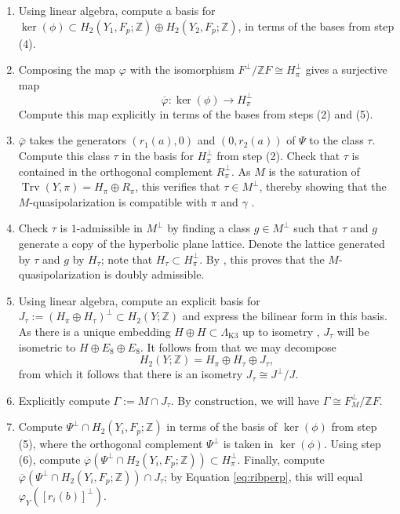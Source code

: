 \documentclass[a4paper]{amsart}
\theoremstyle{definition}
\theoremstyle{plain}
\theoremstyle{remark}
\newcommand{\bZ}{\mathbb{Z}}
\newcommand{\rmK}{\mathrm{K}}
\DeclareMathOperator{\Trv}{Trv}
\numberwithin{figure}{section}
\numberwithin{table}{section}
\begin{document}
\begin{enumerate}
\item Using linear algebra, compute a basis for $\ker(\phi) \subset H_2(Y_1,F_p;\bZ) \oplus H_2(Y_2,F_p;\bZ)$, in terms of the bases from step (4).
\item Composing the map $\varphi$ with the isomorphism $F^{\perp}/\bZ F \cong H_{\pi}^{\perp}$ gives a surjective map
\[\overline{\varphi}\colon \ker(\phi) \longrightarrow H_{\pi}^{\perp}\]
Compute this map explicitly in terms of the bases from steps (2) and (5).
\item $\overline{\varphi}$ takes the generators $(r_1(a),0)$ and $(0,r_2(a))$ of $\Psi$ to the class $\tau$. Compute this class $\tau$ in the basis for $H_{\pi}^{\perp}$ from step (2). Check that $\tau$ is contained in the orthogonal complement $R_{\pi}^{\perp}$. As $M$ is the saturation of $\Trv(Y,\pi) = H_{\pi} \oplus R_{\pi}$, this verifies that $\tau \in M^{\perp}$, thereby showing that the $M$-quasipolarization is compatible with $\pi$ and $\gamma$ \cite[Definition 4.21]{dfk3slpms}.
\item Check $\tau$ is $1$-admissible in $M^{\perp}$ by finding a class $g \in M^{\perp}$ such that $\tau$ and $g$ generate a copy of the hyperbolic plane lattice. Denote the lattice generated by $\tau$ and $g$ by $H_{\tau}$; note that $H_{\tau} \subset H_{\pi}^{\perp}$. By \cite[Proposition 4.30]{dfk3slpms}, this proves that the $M$-quasipolarization is doubly admissible.
\item Using linear algebra, compute an explicit basis for $J_{\tau} := (H_{\pi} \oplus H_{\tau})^{\perp} \subset H_2(Y;\bZ)$ and express the bilinear form in this basis. As there is a unique embedding $H \oplus H \subset \Lambda_{\rmK 3}$ up to isometry \cite[Proposition 1.6.1]{isbfa}, $J_{\tau}$ will be isometric to $H \oplus E_8 \oplus E_8$. It follows from \cite[Lemma 5.4]{mslpk3s} that we may decompose
\[H_2(Y;\bZ) = H_{\pi} \oplus H_{\tau} \oplus J_{\tau},\]
from which it follows that there is an isometry $J_{\tau} \cong J^{\perp}/J$.
\item Explicitly compute $\Gamma := M \cap J_{\tau}$. By construction, we will have $\Gamma \cong F^{\perp}_{M}/\bZ F$.
\item Compute $\Psi^{\perp} \cap H_2(Y_i,F_p;\bZ)$ in terms of the basis of $\ker(\phi)$ from step (5), where the orthogonal complement $\Psi^{\perp}$ is taken in $\ker(\phi)$. Using step (6), compute $\overline{\varphi}(\Psi^{\perp} \cap H_2(Y_i,F_p;\bZ)) \subset H_{\pi}^{\perp}$.  Finally, compute $\overline{\varphi}(\Psi^{\perp} \cap H_2(Y_i,F_p;\bZ)) \cap J_{\tau}$;  by Equation \eqref{eq:ribperp}, this will equal $\varphi_Y([r_i(b)]^{\perp})$.
\end{enumerate}
\end{document}
